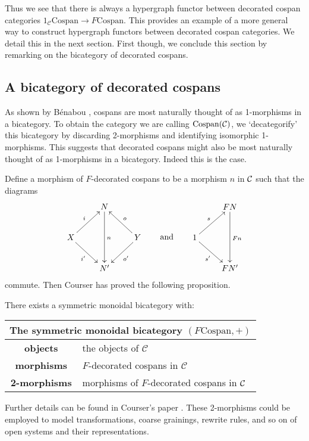Thus we see that there is always a hypergraph functor between decorated cospan
categories $1_{\mathcal C}\mathrm{Cospan} \rightarrow F\mathrm{Cospan}$. This
provides an example of a more general way to construct hypergraph functors
between decorated cospan categories. We detail this in the next section. First
though, we conclude this section by remarking on the bicategory of decorated
cospans.

\subsection{A bicategory of decorated cospans} \label{ssec.bicatdeccospan}
As shown by B\'enabou \cite{Ben67}, cospans are most naturally thought of as
1-morphisms in a bicategory.  To obtain the category we are calling
$\mathrm{Cospan}(\mathcal C)$, we `decategorify' this bicategory by discarding
2-morphisms and identifying isomorphic 1-morphisms. This suggests that decorated
cospans might also be most naturally thought of as 1-morphisms in a bicategory.
Indeed this is the case.  

Define a morphism of $F$-decorated cospans to be a morphism $n$ in $\mathcal C$ such
that the diagrams
\[
  \begin{aligned}
    \xymatrix{
      & N \ar[dd]^n \\  
      X \ar[ur]^{i} \ar[dr]_{i'} && Y \ar[ul]_{o} \ar[dl]^{o'}\\
      & N'
    }
  \end{aligned}
  \qquad \mbox{and}
  \qquad
  \begin{aligned}
    \xymatrix{
      & FN \ar[dd]^{Fn} \\
      1 \ar[ur]^{s} \ar[dr]_{s'} \\
      & FN'
    }
  \end{aligned}
\]
commute. Then Courser has proved the following proposition.
\begin{proposition}
  There exists a symmetric monoidal bicategory with:
\begin{center}
  \begin{tabular}{| c | p{} |}
    \hline
    \multicolumn{2}{|c|}{The symmetric monoidal bicategory $(F\mathrm{Cospan},+)$} \\
    \hline
    \textbf{objects} & the objects of $\mathcal C$ \\ 
    \textbf{morphisms} & $F$-decorated cospans in
    $\mathcal C$\\ 
    \textbf{2-morphisms} & morphisms of $F$-decorated cospans in $\mathcal C$ \\
    \hline
  \end{tabular}
\end{center}
\end{proposition}
Further details can be found in Courser's paper \cite{Cou16}. These 2-morphisms
could be employed to model transformations, coarse grainings, rewrite rules, and
so on of open systems and their representations.


